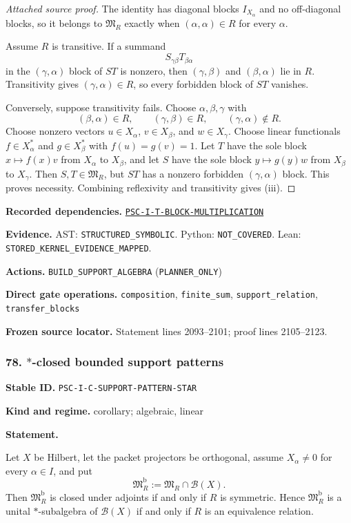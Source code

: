 \documentclass[a4paper,11pt]{article}
\newcommand{\field}[2]{\noindent\textbf{#1.} #2\par}
\begin{document}
\begin{proof}[Attached source proof]
The identity has diagonal blocks $I_{X_\alpha}$ and no off-diagonal blocks, so it belongs to $\mathfrak M_R$ exactly when $(\alpha,\alpha)\in R$ for every $\alpha$.

Assume $R$ is transitive.  If a summand
\[
S_{\gamma\beta}T_{\beta\alpha}
\]
in the $(\gamma,\alpha)$ block of $ST$ is nonzero, then $(\gamma,\beta)$ and $(\beta,\alpha)$ lie in $R$.  Transitivity gives $(\gamma,\alpha)\in R$, so every forbidden block of $ST$ vanishes.

Conversely, suppose transitivity fails.  Choose $\alpha,\beta,\gamma$ with
\[
(\beta,\alpha)\in R,
\qquad
(\gamma,\beta)\in R,
\qquad
(\gamma,\alpha)\notin R.
\]
Choose nonzero vectors $u\in X_\alpha$, $v\in X_\beta$, and $w\in X_\gamma$.  Choose linear functionals $f\in X_\alpha^*$ and $g\in X_\beta^*$ with $f(u)=g(v)=1$.  Let $T$ have the sole block $x\mapsto f(x)v$ from $X_\alpha$ to $X_\beta$, and let $S$ have the sole block $y\mapsto g(y)w$ from $X_\beta$ to $X_\gamma$.  Then $S,T\in\mathfrak M_R$, but $ST$ has a nonzero forbidden $(\gamma,\alpha)$ block.  This proves necessity.  Combining reflexivity and transitivity gives (iii).
\end{proof}
\field{Recorded dependencies}{\hyperref[rec:PSC-I-T-BLOCK-MULTIPLICATION]{\nolinkurl{PSC-I-T-BLOCK-MULTIPLICATION}}}
\field{Evidence}{AST: \nolinkurl{STRUCTURED_SYMBOLIC}. Python: \nolinkurl{NOT_COVERED}. Lean: \nolinkurl{STORED_KERNEL_EVIDENCE_MAPPED}.}
\field{Actions}{\nolinkurl{BUILD_SUPPORT_ALGEBRA} (\nolinkurl{PLANNER_ONLY})}
\field{Direct gate operations}{\nolinkurl{composition}, \nolinkurl{finite_sum}, \nolinkurl{support_relation}, \nolinkurl{transfer_blocks}}
\field{Frozen source locator}{Statement lines 2093--2101; proof lines 2105--2123.}
\subsubsection*{78. $*$-closed bounded support patterns}
\label{rec:PSC-I-C-SUPPORT-PATTERN-STAR}
\field{Stable ID}{\nolinkurl{PSC-I-C-SUPPORT-PATTERN-STAR}}
\field{Kind and regime}{corollary; algebraic, linear}
\textbf{Statement.}\par
Let $X$ be Hilbert, let the packet projectors be orthogonal, assume $X_\alpha\neq0$ for every $\alpha\in I$, and put
\[
\mathfrak M_R^{\mathrm b}:=\mathfrak M_R\cap\mathcal B(X).
\]
Then $\mathfrak M_R^{\mathrm b}$ is closed under adjoints if and only if $R$ is symmetric.  Hence $\mathfrak M_R^{\mathrm b}$ is a unital $*$-subalgebra of $\mathcal B(X)$ if and only if $R$ is an equivalence relation.
\end{document}
